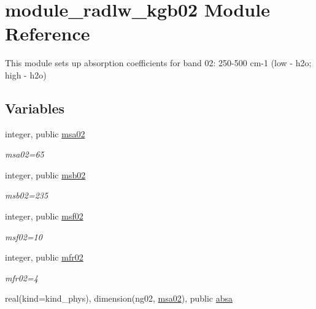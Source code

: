 \hypertarget{namespacemodule__radlw__kgb02}{}\section{module\+\_\+radlw\+\_\+kgb02 Module Reference}
\label{namespacemodule__radlw__kgb02}


This module sets up absorption coefficients for band 02\+: 250-\/500 cm-\/1 (low -\/ h2o; high -\/ h2o)  


\subsection*{Variables}
\begin{DoxyCompactItemize}
\item 
\mbox{\label{namespacemodule__radlw__kgb02_a370b514d7834ac2a22d245f118882bf4}} 
integer, public \hyperlink{namespacemodule__radlw__kgb02_a370b514d7834ac2a22d245f118882bf4}{msa02}
\begin{DoxyCompactList}\small\item\em msa02=65 \end{DoxyCompactList}\item 
integer, public \hyperlink{group__module__radlw__kgbnn_ga03e70b84fd16795104a3fb7b425af70c}{msb02}
\begin{DoxyCompactList}\small\item\em msb02=235 \end{DoxyCompactList}\item 
integer, public \hyperlink{group__module__radlw__kgbnn_ga99b728d38d664afc203303563541ab5c}{msf02}
\begin{DoxyCompactList}\small\item\em msf02=10 \end{DoxyCompactList}\item 
integer, public \hyperlink{group__module__radlw__kgbnn_ga2973c2e9220e85b74f0b251c896aa837}{mfr02}
\begin{DoxyCompactList}\small\item\em mfr02=4 \end{DoxyCompactList}\item 
real(kind=kind\+\_\+phys), dimension(ng02, \hyperlink{namespacemodule__radlw__kgb02_a370b514d7834ac2a22d245f118882bf4}{msa02}), public \hyperlink{group__module__radlw__kgbnn_ga46db893d4456b2d867130bb208cb2206}{absa}

\end{DoxyCompactItemize}
